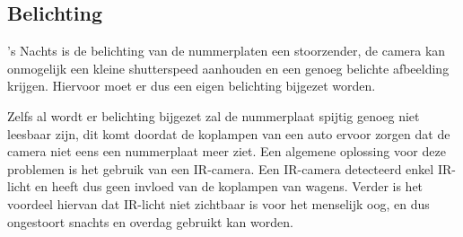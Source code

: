 \subsection{Belichting}
's Nachts is de belichting van de nummerplaten een stoorzender, de camera kan onmogelijk een kleine shutterspeed aanhouden en een genoeg belichte afbeelding krijgen. Hiervoor moet er dus een eigen belichting bijgezet worden.

Zelfs al wordt er belichting bijgezet zal de nummerplaat spijtig genoeg niet leesbaar zijn, dit komt doordat de koplampen van een auto ervoor zorgen dat de camera niet eens een nummerplaat meer ziet. Een algemene oplossing voor deze problemen is het gebruik van een IR-camera. Een IR-camera detecteerd enkel IR-licht en heeft dus geen invloed van de koplampen van wagens. Verder is het voordeel hiervan dat IR-licht niet zichtbaar is voor het menselijk oog, en dus ongestoort snachts en overdag gebruikt kan worden.

